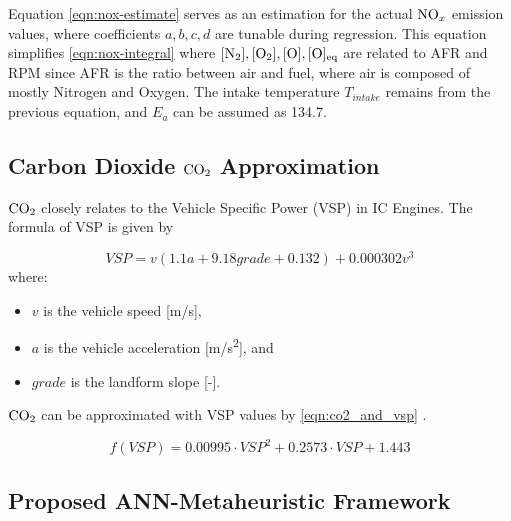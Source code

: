 \documentclass[runningheads]{llncs}
\begin{document}
Equation \eqref{eqn:nox-estimate} serves as an estimation for the actual $\ce{NO_x}$ emission values,
where coefficients $a,b,c,d$ are tunable during regression. This equation simplifies \eqref{eqn:nox-integral}
where $[\ce{N_2}], [\ce{O_2}], [\ce{O}], [\ce{O}]\textsubscript{eq}$ are related to AFR and RPM since AFR
is the ratio between air and fuel, where air is composed of mostly Nitrogen and Oxygen. The intake temperature
$T_{intake}$ remains from the previous equation, and $E_a$ can be assumed as 134.7.

\subsection{Carbon Dioxide $\ce{CO2}$ Approximation}\label{sec:co(-_2-)-modelling}

$\ce{CO2}$ closely relates to the Vehicle Specific Power (VSP) in IC Engines. The formula of VSP is given by

\begin{equation}
	VSP = v(1.1a + 9.18grade + 0.132) + 0.000302v^3 \label{eq:vsp}
\end{equation}
where:
\begin{itemize}
	\item $v$ is the vehicle speed [m/s],
	\item $a$ is the vehicle acceleration [m/s\textsuperscript{2}], and
	\item $grade$ is the landform slope [-].
\end{itemize}

$\ce{CO2}$ can be approximated with VSP values by \eqref{eqn:co2_and_vsp} \cite{CHEN2024133892}.

\begin{equation}
	f(VSP) = 0.00995 \cdot VSP^2 + 0.2573 \cdot VSP + 1.443 \label{eqn:co2_and_vsp}
\end{equation}

\subsection{Proposed ANN-Metaheuristic Framework}
\end{document}
